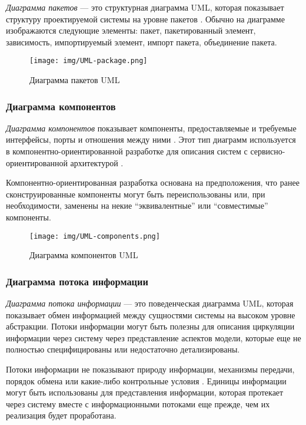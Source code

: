 \documentclass[14pt,russian]{extarticle}
\newcommand*\term[1]{\textit{#1}}
\begin{document}
\term{Диаграмма пакетов} --- это структурная диаграмма UML, которая показывает
структуру проектируемой системы на уровне пакетов \cite{martin}. Обычно на диаграмме
изображаются следующие элементы: пакет, пакетированный элемент, зависимость,
импортируемый элемент, импорт пакета, объединение пакета.

\begin{figure}[H]
	\centering
	\texttt{[image: img/UML-package.png]}
	\caption{Диаграмма пакетов UML}
\end{figure}

\subsubsection{Диаграмма компонентов}

\term{Диаграмма компонентов} показывает компоненты, предоставляемые и требуемые
интерфейсы, порты и отношения между ними \cite{buch}. Этот тип диаграмм используется в
компонентно-ориентированной разработке для описания систем с
сервисно-ориентированной архитектурой \cite{douglass}.

Компонентно-ориентированная разработка основана на предположения, что ранее
сконструированные компоненты могут быть переиспользованы или, при необходимости,
заменены на некие ``эквивалентные'' или ``совместимые'' компоненты.

\begin{sidewaysfigure}
	\centering
	\texttt{[image: img/UML-components.png]}
	\caption{Диаграмма компонентов UML}
\end{sidewaysfigure}

\subsubsection{Диаграмма потока информации}

\term{Диаграмма потока информации} --- это поведенческая диаграмма UML, которая
показывает обмен информацией между сущностями системы на высоком уровне
абстракции. Потоки информации могут быть полезны для описания циркуляции
информации через систему через представление аспектов модели, которые еще не
полностью специфицированы или недостаточно детализированы.

Потоки информации не показывают природу информации, механизмы передачи, порядок
обмена или какие-либо контрольные условия \cite{penker}. Единицы информации могут быть
использованы для представления информации, которая протекает через систему
вместе с информационными потоками еще прежде, чем их реализация будет
проработана.
\end{document}
